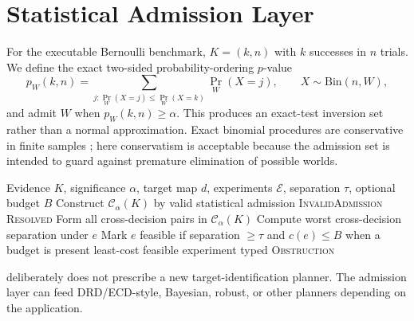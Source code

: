 \documentclass[11pt]{article}
\newcommand{\CalC}{\mathcal{C}}
\newcommand{\CalE}{\mathcal{E}}
\begin{document}
\section{Statistical Admission Layer}
For the executable Bernoulli benchmark, $K=(k,n)$ with $k$ successes in $n$ trials. We define the exact two-sided probability-ordering $p$-value
\begin{equation}
 p_W(k,n)=\sum_{j: \Pr_W(X=j)\le \Pr_W(X=k)}\Pr_W(X=j),\qquad X\sim\mathrm{Bin}(n,W),
\end{equation}
and admit $W$ when $p_W(k,n)\ge\alpha$. This produces an exact-test inversion set rather than a normal approximation. Exact binomial procedures are conservative in finite samples \parencite{clopper1934,blyth1983,brown2001}; here conservatism is acceptable because the admission set is intended to guard against premature elimination of possible worlds.

\begin{algorithm}[H]
\caption{Evidence-first admission and resolution interface}
\label{alg:interface}
\begin{algorithmic}[1]
\Require Evidence $K$, significance $\alpha$, target map $d$, experiments $\CalE$, separation $\tau$, optional budget $B$
\State Construct $\CalC_\alpha(K)$ by valid statistical admission
\If{$\CalC_\alpha(K)=\varnothing$}
  \State \Return \textsc{InvalidAdmission}
\EndIf
\If{$d$ is constant on $\CalC_\alpha(K)$}
  \State \Return \textsc{Resolved}
\EndIf
\State Form all cross-decision pairs in $\CalC_\alpha(K)$
\For{$e\in\CalE$}
  \State Compute worst cross-decision separation under $e$
  \State Mark $e$ feasible if separation $\ge\tau$ and $c(e)\le B$ when a budget is present
\EndFor
{}
  \State \Return least-cost feasible experiment
\Else
  \State \Return typed \textsc{Obstruction}
\EndIf
\end{algorithmic}
\end{algorithm}

 deliberately does not prescribe a new target-identification planner. The admission layer can feed DRD/ECD-style, Bayesian, robust, or other planners depending on the application.
\end{document}
